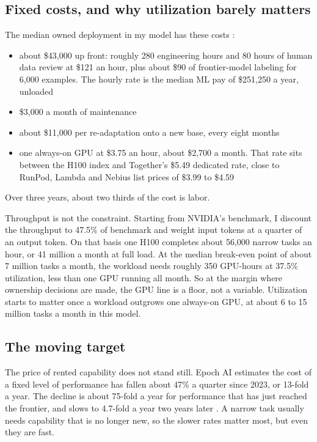 \subsection{Fixed costs, and why utilization barely matters}

The median owned deployment in my model has these costs :

\begin{itemize}
\tightlist
\item
  about \$43,000 up front: roughly 280 engineering hours and 80 hours of human data review at \$121 an hour, plus about \$90 of frontier-model labeling for 6,000 examples. The hourly rate is the \citet{levels2026ml} median ML pay of \$251,250 a year, unloaded
\item
  \$3,000 a month of maintenance
\item
  about \$11,000 per re-adaptation onto a new base, every eight months
\item
  one always-on GPU at \$3.75 an hour, about \$2,700 a month. That rate sits between the H100 index and Together's \$5.49 dedicated rate, close to RunPod, Lambda and Nebius list prices of \$3.99 to \$4.59
\end{itemize}

Over three years, about two thirds of the cost is labor.

Throughput is not the constraint. Starting from NVIDIA's benchmark, I discount the throughput to 47.5\% of benchmark and weight input tokens at a quarter of an output token. On that basis one H100 completes about 56,000 narrow tasks an hour, or 41 million a month at full load. At the median break-even point of about 7 million tasks a month, the workload needs roughly 350 GPU-hours at 37.5\% utilization, less than one GPU running all month. So at the margin where ownership decisions are made, the GPU line is a floor, not a variable. Utilization starts to matter once a workload outgrows one always-on GPU, at about 6 to 15 million tasks a month in this model.

\subsection{The moving target}

The price of rented capability does not stand still.  Epoch AI estimates the cost of a fixed level of performance has fallen about 47\% a quarter since 2023, or 13-fold a year. The decline is about 75-fold a year for performance that has just reached the frontier, and slows to 4.7-fold a year two years later \citep{emberson2026price}. A narrow task usually needs capability that is no longer new, so the slower rates matter most, but even they are fast.

